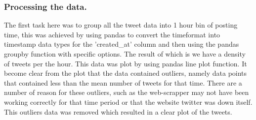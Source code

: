 \documentclass[9pt]{article}
\begin{document}
\subsubsection{Processing the data.}
The first task here was to group all the tweet data into 1 hour bin of posting time, this
was achieved by using pandas to convert the timeformat into timestamp data types for the
'created\_at' column and then using the pandas groupby function with specific options. The
result of which is we have a density of tweets per the hour. This data was plot by using
pandas line plot function. It become clear from the plot that the data contained outliers,
namely data points that contained less than the mean number of tweets for that time. There
are a number of reason for these outliers, such as the web-scrapper may not have been
working correctly for that time period or that the website twitter was down itself. This
outliers data was removed which resulted in a clear plot of the tweets.
\end{document}
